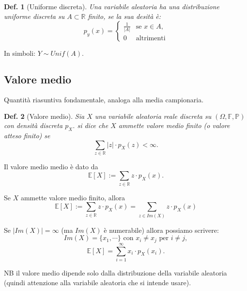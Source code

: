 \documentclass{article}
\newtheorem{definition}{Def.}[section]
\begin{document}
\begin{definition}[Uniforme discreta]
	Una variabile aleatoria ha una distribuzione uniforme discreta su $A \subset 
	\mathbb{R}$ finito, se la sua desità è:
	\begin{equation}
		p_y(x) =
		\begin{cases}
			\frac{1}{|A|} & \text{se } x \in A,\\
			0 & \text{altrimenti}
		\end{cases}
	\end{equation}
\end{definition}

In simboli: $Y \sim Unif(A)$.\\

\subsection{Valore medio}
Quantità riasuntiva fondamentale, analoga alla media campionaria.

\begin{definition}[Valore medio]
	Sia $X$ una variabile aleatoria reale discreta su $(\Omega, \mathbb{F, P})$
	con densità discreta $p_X$. si dice che $X$ ammette valore medio finito (o
	valore atteso finito) se
	\begin{equation}
		\sum_{z \in \mathbb{R}} |z| \cdot p_X(z) < \infty.
	\end{equation}
\end{definition}

Il valore medio medio è dato da 
\begin{equation}
	\mathbb{E}[X] := \sum_{z \in \mathbb{R}} z \cdot p_X(x).
\end{equation}

Se $X$ ammette valore medio finito, allora
\begin{equation}
	\mathbb{E}[X] := \sum_{z \in \mathbb{R}} z \cdot p_X(x) = \sum_{z \in Im(X)} z \cdot p_X(x)
\end{equation}

Se $|Im(X)| = \infty$ (ma $Im(X)$ è numerabile) allora possiamo scrivere:
\begin{equation*}
	Im(X) = \{x_1, \cdots \} \text{ con } x_i \neq x_j \text{ per } i \neq j,
\end{equation*}
\begin{equation}
	\mathbb{E}[X] = \sum_{i = 1}^{\infty}x_i \cdot p_X(x_i).
\end{equation}

NB il valore medio dipende solo dalla distribuzione della variabile aleatoria
(quindi attenzione alla variabile aleatoria che si intende usare).
\end{document}
